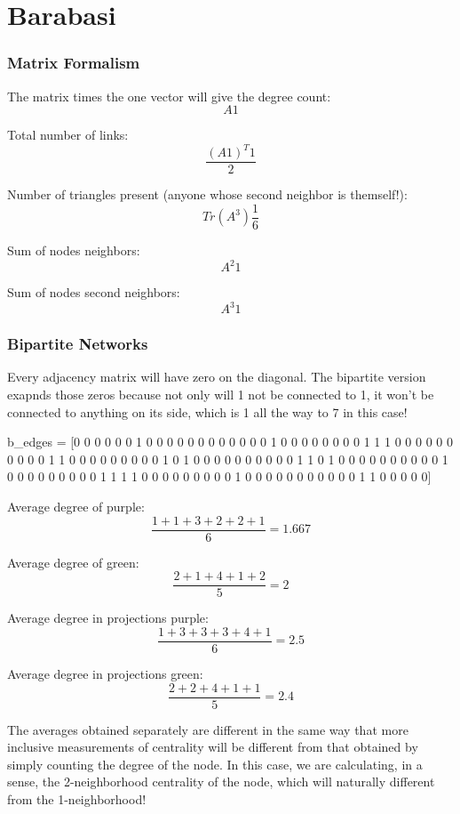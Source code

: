 \documentclass[a4paper,12pt]{article}
\begin{document}
\section*{Barabasi}

\subsubsection*{Matrix Formalism}

The matrix times the one vector will give the degree count:
$$
A1
$$

Total number of links:
$$
\frac{(A 1)^T1 }{2}
$$

Number of triangles present (anyone whose second neighbor is themself!):
$$
Tr(A^3)\frac{1}{6}
$$

Sum of nodes neighbors:
$$
A^2 1
$$

Sum of nodes second neighbors:
$$
A^3 1
$$

\subsubsection*{Bipartite Networks}

Every adjacency matrix will have zero on the diagonal. The bipartite version exapnds those zeros because not only will 1 not be connected to 1, it won't be connected to anything on its side, which is 1 all the way to 7 in this case!

\begin{juliacode}
b_edges = [0 0 0 0 0 0 1 0 0 0 0
           0 0 0 0 0 0 0 0 1 0 0
           0 0 0 0 0 0 1 1 1 0 0
           0 0 0 0 0 0 0 0 1 1 0
           0 0 0 0 0 0 0 0 1 0 1
           0 0 0 0 0 0 0 0 0 0 1
           1 0 1 0 0 0 0 0 0 0 0
           0 0 1 0 0 0 0 0 0 0 0
           0 1 1 1 1 0 0 0 0 0 0
           0 0 0 1 0 0 0 0 0 0 0
           0 0 0 0 1 1 0 0 0 0 0]
\end{juliacode}


Average degree of purple:
$$
\frac{1 + 1 + 3 + 2 + 2 + 1}{6} = 1.667
$$

Average degree of green:
$$
\frac{2 + 1 + 4 + 1 + 2}{5} = 2
$$

Average degree in projections purple:
$$
\frac{1 + 3 + 3 + 3 + 4 + 1}{6} = 2.5
$$

Average degree in projections green:
$$
\frac{2 + 2 + 4 + 1 + 1}{5} = 2.4
$$

The averages obtained separately are different in the same way that more inclusive measurements of centrality will be different from that obtained by simply counting the degree of the node. In this case, we are calculating, in a sense, the 2-neighborhood centrality of the node, which will naturally different from the 1-neighborhood!
\end{document}
